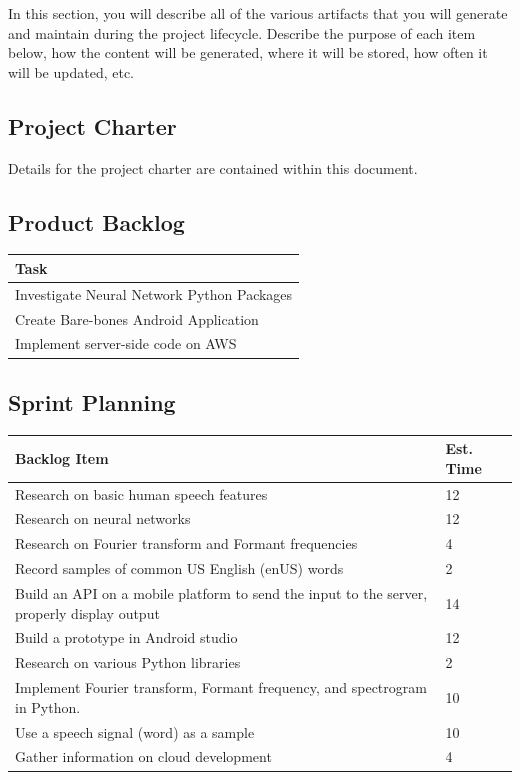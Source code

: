 In this section, you will describe all of the various artifacts that you will generate and maintain during the project lifecycle. Describe the purpose of each item below, how the content will be generated, where it will be stored, how often it will be updated, etc. 

\subsection{Project Charter}
Details for the project charter are contained within this document.

\subsection{Product Backlog}
\begin{table}[htbp]
    \centering
    \begin{tabularx}{\textwidth}{l}
        Task\\
        \hline
        Investigate Neural Network Python Packages\\
        Create Bare-bones Android Application\\
        Implement server-side code on AWS\\
    \end{tabularx}
\end{table}

\subsection{Sprint Planning}
\begin{table}[htbp]
    \centering
    \begin{tabularx}{\textwidth}{l|l}
        Backlog Item & Est. Time\\
        \hline
        Research on basic human speech features & 12\\
        Research on neural networks & 12\\
        Research on Fourier transform and Formant frequencies & 4\\
        Record samples of common US English (enUS) words & 2\\
        Build an API on a mobile platform to send the input to the server, properly display output & 14\\
        Build a prototype in Android studio & 12\\
        Research on various Python libraries & 2\\
        Implement Fourier transform, Formant frequency, and spectrogram in Python. & 10\\
        Use a speech signal (word) as a sample & 10\\
        Gather information on cloud development & 4\\
    \end{tabularx}
\end{table}

